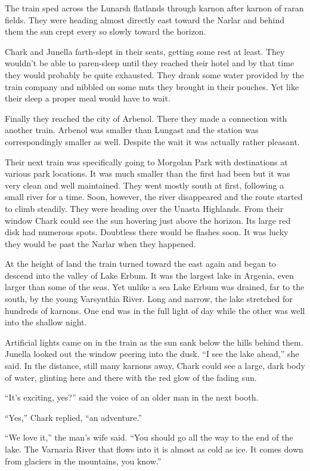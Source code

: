 The train sped across the Lunarsh flatlands through karnon after karnon of raran fields. They
were heading almost directly east toward the Narlar and behind them the sun crept every so
slowly toward the horizon.

Chark and Junella farth-slept in their seats, getting some rest at least. They wouldn't be able
to paren-sleep until they reached their hotel and by that time they would probably be quite
exhausted. They drank some water provided by the train company and nibbled on some nuts they
brought in their pouches. Yet like their sleep a proper meal would have to wait.

Finally they reached the city of Arbenol. There they made a connection with another train.
Arbenol was smaller than Lungast and the station was correspondingly smaller as well. Despite
the wait it was actually rather pleasant.

Their next train was specifically going to Morgolan Park with destinations at various park
locations. It was much smaller than the first had been but it was very clean and well
maintained. They went mostly south at first, following a small river for a time. Soon, however,
the river disappeared and the route started to climb steadily. They were heading over the Unasta
Highlands. From their window Chark could see the sun hovering just above the horizon. Its large
red disk had numerous spots. Doubtless there would be flashes soon. It was lucky they would be
past the Narlar when they happened.

At the height of land the train turned toward the east again and began to descend into the
valley of Lake Erbum. It was the largest lake in Argenia, even larger than some of the seas. Yet
unlike a sea Lake Erbum was drained, far to the south, by the young Varsynthia River. Long and
narrow, the lake stretched for hundreds of karnons. One end was in the full light of day while
the other was well into the shallow night.

Artificial lights came on in the train as the sun sank below the hills behind them. Junella
looked out the window peering into the dusk. ``I see the lake ahead,'' she said. In the
distance, still many karnons away, Chark could see a large, dark body of water, glinting here
and there with the red glow of the fading sun.

``It's exciting, yes?'' said the voice of an older man in the next booth.

``Yes,'' Chark replied, ``an adventure.''

``We love it,'' the man's wife said. ``You should go all the way to the end of the lake. The
Varnaria River that flows into it is almost as cold as ice. It comes down from glaciers in the
mountains, you know.''

